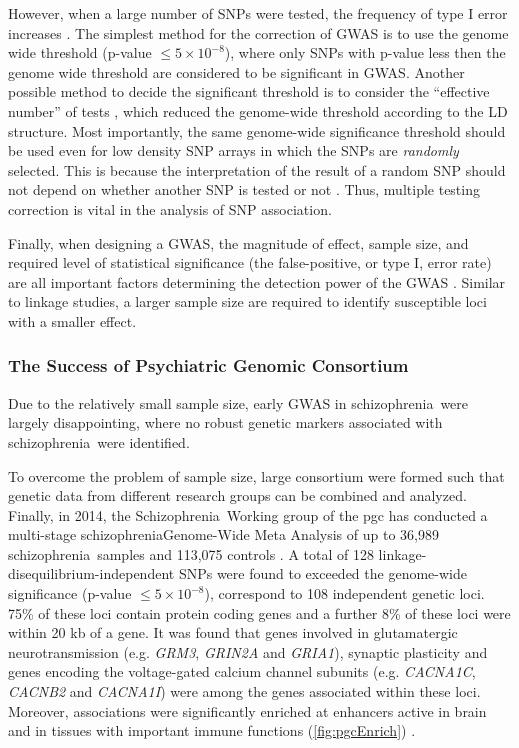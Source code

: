\documentclass[12pt]{scrbook}
\newcommand*{\scz}{schizophrenia}
\newcommand*{\Scz}{Schizophrenia}
\begin{document}
However, when a large number of \glspl{SNP} were tested, the frequency of type I error increases \citep{Peters2010}.
The simplest method for the correction of \gls{GWAS} is to use the genome wide threshold (p-value $\le5\times10^{-8}$), where only \glspl{SNP} with p-value less then the genome wide threshold are considered to be significant in \gls{GWAS}.
Another possible method to decide the significant threshold is to consider the ``effective number'' of tests \citep{Li2011}, which reduced the genome-wide threshold according to the \gls{LD} structure.
Most importantly, the same genome-wide significance threshold should be used even for low density \gls{SNP} arrays in which the \glspl{SNP} are \emph{randomly} selected.
This is because the interpretation of the result of a random \gls{SNP} should not depend on whether another \gls{SNP} is tested or not \citep{gelman2016statistical,Sham2014}.
Thus, multiple testing correction is vital in the analysis of \gls{SNP} association.


Finally, when designing a \gls{GWAS}, the magnitude of effect, sample size, and required level of statistical significance (the false-positive, or type I, error rate) are all important factors determining the detection power of the \gls{GWAS} \citep{Purcell2003}.
Similar to linkage studies, a larger sample size are required to identify susceptible loci with a smaller effect. 

\subsubsection{The Success of Psychiatric Genomic Consortium} 
Due to the relatively small sample size, early \gls{GWAS} in \scz\ were largely disappointing, where no robust genetic markers associated with \scz\ were identified. 

To overcome the problem of sample size, large consortium were formed such that genetic data from different research groups can be combined and analyzed.
Finally, in 2014, the \Scz\ Working group of the \gls{pgc} has conducted a multi-stage \scz Genome-Wide Meta Analysis of up to 36,989 \scz\ samples and 113,075 controls \citep{Ripke2014}.
A total of 128 linkage-disequilibrium-independent \glspl{SNP} were found to exceeded the genome-wide significance (p-value $\le 5\times10^{-8}$), correspond to 108 independent genetic loci.
75\% of these loci contain protein coding genes and a further 8\% of these loci were within 20 \gls{kb} of a gene. 
It was found that genes involved in glutamatergic neurotransmission (e.g. \textit{GRM3}, \textit{GRIN2A} and \textit{GRIA1}), synaptic plasticity and genes encoding the voltage-gated calcium channel subunits (e.g. \textit{CACNA1C}, \textit{CACNB2} and \textit{CACNA1I}) were among the genes associated within these loci.
Moreover, associations were significantly enriched at enhancers active in brain and in tissues with important immune functions (\cref{fig:pgcEnrich}) \citep{Ripke2014}.
\end{document}
